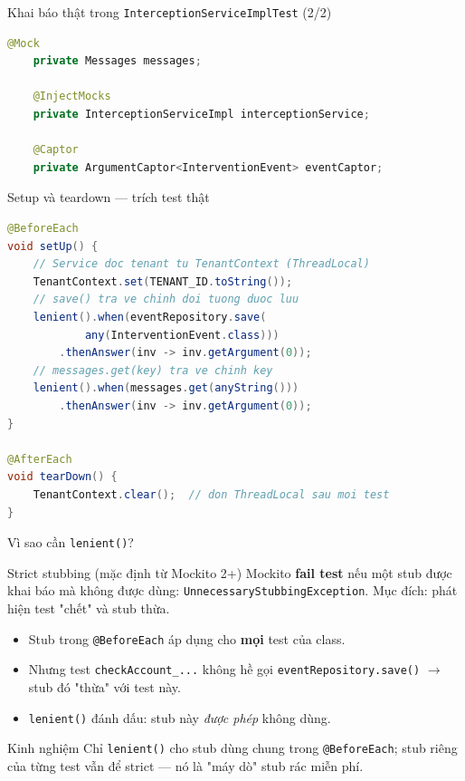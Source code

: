\documentclass[aspectratio=169,12pt]{beamer}
\begin{document}
\begin{frame}[fragile]{Khai báo thật trong \texttt{InterceptionServiceImplTest} (2/2)}
\begin{lstlisting}[language=java,basicstyle=\ttfamily\scriptsize]
    @Mock
    private Messages messages;

    @InjectMocks
    private InterceptionServiceImpl interceptionService;

    @Captor
    private ArgumentCaptor<InterventionEvent> eventCaptor;
\end{lstlisting}
\end{frame}

\begin{frame}[fragile]{Setup và teardown --- trích test thật}
\begin{lstlisting}[language=java,basicstyle=\ttfamily\footnotesize,aboveskip=0pt,belowskip=0pt]
@BeforeEach
void setUp() {
    // Service doc tenant tu TenantContext (ThreadLocal)
    TenantContext.set(TENANT_ID.toString());
    // save() tra ve chinh doi tuong duoc luu
    lenient().when(eventRepository.save(
            any(InterventionEvent.class)))
        .thenAnswer(inv -> inv.getArgument(0));
    // messages.get(key) tra ve chinh key
    lenient().when(messages.get(anyString()))
        .thenAnswer(inv -> inv.getArgument(0));
}

@AfterEach
void tearDown() {
    TenantContext.clear();  // don ThreadLocal sau moi test
}
\end{lstlisting}
\end{frame}

\begin{frame}{Vì sao cần \texttt{lenient()}?}
  \begin{block}{Strict stubbing (mặc định từ Mockito 2+)}
    Mockito \textbf{fail test} nếu một stub được khai báo mà không được dùng:
    \texttt{UnnecessaryStubbingException}. Mục đích: phát hiện test "chết"
    và stub thừa.
  \end{block}

  \begin{itemize}
    \item Stub trong \texttt{@BeforeEach} áp dụng cho \textbf{mọi} test của class.
    \item Nhưng test \texttt{checkAccount\_...} không hề gọi
      \texttt{eventRepository.save()} $\to$ stub đó "thừa" với test này.
    \item \texttt{lenient()} đánh dấu: stub này \textit{được phép} không dùng.
  \end{itemize}

  \begin{exampleblock}{Kinh nghiệm}
    Chỉ \texttt{lenient()} cho stub dùng chung trong \texttt{@BeforeEach};
    stub riêng của từng test vẫn để strict --- nó là "máy dò" stub rác miễn phí.
  \end{exampleblock}
\end{frame}
\end{document}
